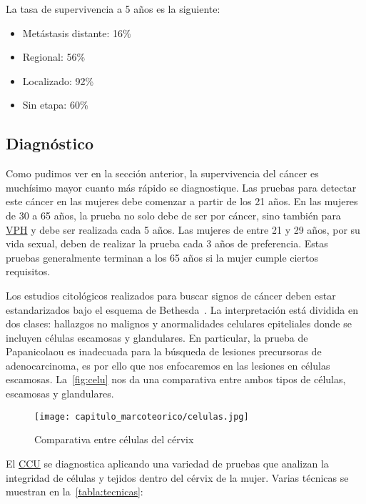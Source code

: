 La tasa de supervivencia a 5 años es la siguiente:

\begin{itemize}
    \item Metástasis distante: 16\%
    \item Regional: 56\%
    \item Localizado: 92\%
    \item Sin etapa: 60\%
\end{itemize}

\subsection{Diagnóstico}

Como pudimos ver en la sección anterior, la supervivencia del cáncer es
muchísimo mayor cuanto más rápido se diagnostique. Las pruebas para detectar
este cáncer en las mujeres debe comenzar a partir de los 21 años. En las mujeres
de 30 a 65 años, la prueba no solo debe de ser por cáncer, sino también para
\hyperlink{abbr}{VPH} y debe ser realizada cada 5 años. Las mujeres de entre 21
y 29 años, por su vida sexual, deben de realizar la prueba cada 3 años de
preferencia. Estas pruebas generalmente terminan a los 65 años si la mujer
cumple ciertos requisitos.

Los estudios citológicos realizados para buscar signos de cáncer deben estar
estandarizados bajo el esquema de Bethesda~\cite{Kurman1995}. La interpretación
está dividida en dos clases: hallazgos no malignos y anormalidades celulares
epiteliales donde se incluyen células escamosas y glandulares. En particular, la
prueba de Papanicolaou es inadecuada para la búsqueda de lesiones precursoras de
adenocarcinoma, es por ello que nos enfocaremos en las lesiones en células
escamosas. La~\autoref{fig:celu} nos da una comparativa entre ambos tipos
de células, escamosas y glandulares. 


\begin{figure}[H]
    \centering
    \texttt{[image: capitulo\_marcoteorico/celulas.jpg]}
    \caption{Comparativa entre células del cérvix}\label{fig:celu}
\end{figure}

El \hyperlink{abbr}{CCU} se diagnostica aplicando una variedad de pruebas que
analizan la integridad de células y tejidos dentro del cérvix de la mujer.
Varias técnicas se muestran en la~\autoref{tabla:tecnicas}:

